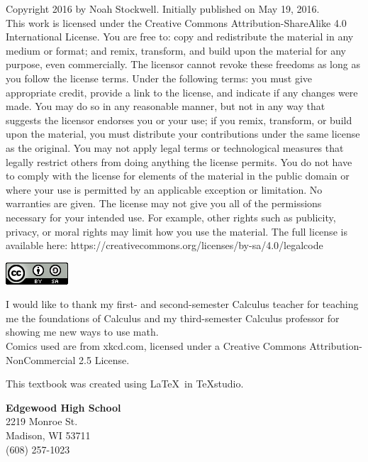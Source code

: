 \documentclass[../revisedmain.tex]{subfiles}
\begin{document}
	Copyright 2016 by Noah Stockwell. Initially published on May 19, 2016.\\
	 This work is licensed under the Creative Commons Attribution-ShareAlike 4.0 International License. You are free to: copy and redistribute the material in any medium or format; and remix, transform, and build upon the material for any purpose, even commercially. The licensor cannot revoke these freedoms as long as you follow the license terms. Under the following terms: you must give appropriate credit, provide a link to the license, and indicate if any changes were made. You may do so in any reasonable manner, but not in any way that suggests the licensor endorses you or your use; if you remix, transform, or build upon the material, you must distribute your contributions under the same license as the original. You may not apply legal terms or technological measures that legally restrict others from doing anything the license permits. You do not have to comply with the license for elements of the material in the public domain or where your use is permitted by an applicable exception or limitation. No warranties are given. The license may not give you all of the permissions necessary for your intended use. For example, other rights such as publicity, privacy, or moral rights may limit how you use the material. The full license is available here: https://creativecommons.org/licenses/by-sa/4.0/legalcode\\
	\begin{center}\includegraphics[width=.5in]{license}\end{center}\vfill I would like to thank my first- and second-semester Calculus teacher for teaching me the foundations of Calculus and my third-semester Calculus professor for showing me new ways to use math.\\\vfill
	Comics used are from xkcd.com, licensed under a Creative Commons Attribution-NonCommercial 2.5 License.\\
	\vspace{.25in}\par This textbook was created using \LaTeX\, in TeXstudio.\\
	\vspace{.25in}
	\begin{flushright}
	\textbf{Edgewood High School}\\
	2219 Monroe St.\\ Madison, WI 53711\\ (608) 257-1023
	\end{flushright}
\end{document}
